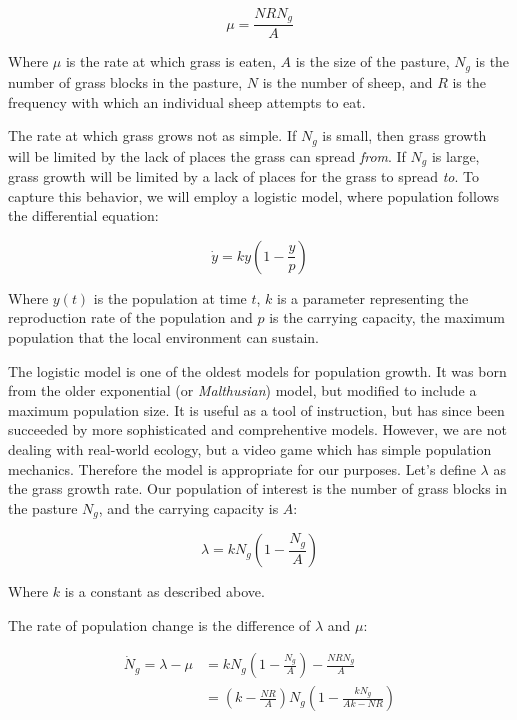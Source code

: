 \documentclass{article}
\begin{document}
\begin{equation}
    \label{sheep_eat}
    \mu=\frac{NRN_g}{A}
\end{equation}

Where $\mu$ is the rate at which grass is eaten, $A$ is the size of the pasture, $N_g$ is the number of grass blocks in the pasture, $N$ is the number of sheep, and $R$ is the frequency with which an individual sheep attempts to eat.

The rate at which grass grows not as simple. If $N_g$ is small, then grass growth will be limited by the lack of places the grass can spread \textit{from}. If $N_g$ is large, grass growth will be limited by a lack of places for the grass to spread \textit{to}. To capture this behavior, we will employ a logistic model, where population follows the differential equation:

\begin{equation}
    \label{logistic_generic}
    \dot{y}=ky\left(1-\frac{y}{p}\right)
\end{equation}

Where $y(t)$ is the population at time $t$, $k$ is a parameter representing the reproduction rate of the population and $p$ is the carrying capacity, the maximum population that the local environment can sustain.

The logistic model is one of the oldest models for population growth. It was born from the older exponential (or \textit{Malthusian}) model, but modified to include a maximum population size. It is useful as a tool of instruction, but has since been succeeded by more sophisticated and comprehentive models. However, we are not dealing with real-world ecology, but a video game which has simple population mechanics. Therefore the model is appropriate for our purposes. Let's define $\lambda$ as the grass growth rate. Our population of interest is the number of grass blocks in the pasture $N_g$, and the carrying capacity is $A$:

\begin{equation}
    \label{grass_regrow}
    \lambda=kN_g\left(1-\frac{N_g}{A}\right)  
\end{equation}

Where $k$ is a constant as described above.

The rate of population change is the difference of $\lambda$ and $\mu$:

\begin{equation*}
    \begin{split}
        \dot{N}_g=\lambda-\mu&=kN_g\left(1-\frac{N_g}{A}\right)-\frac{NRN_g}{A}\\
        &=\left(k-\frac{NR}{A}\right)N_g\left(1-\frac{kN_g}{Ak-NR}\right)
    \end{split}
\end{equation*}
\end{document}

